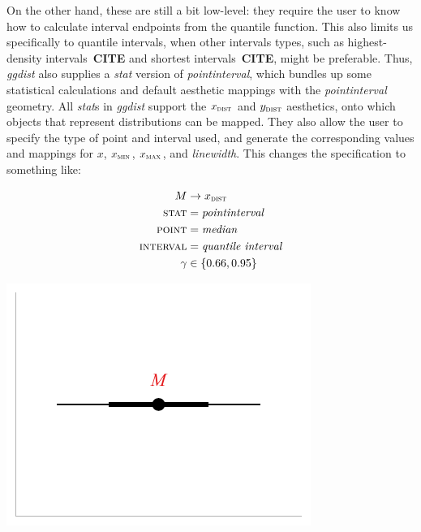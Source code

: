 \documentclass[journal]{vgtc}                     %
\begin{document}
On the other hand, these are still a bit low-level: they require the user to know how to calculate interval endpoints from the quantile function. This also limits us specifically to quantile intervals, when other intervals types, such as highest-density intervals~\textbf{CITE} and shortest intervals~\textbf{CITE}, might be preferable. Thus, \textit{ggdist} also supplies a \textit{stat} version of \textit{pointinterval}, which bundles up some statistical calculations and default aesthetic mappings with the \textit{pointinterval} geometry. All \textit{stat}s in \textit{ggdist} support the $x_\textsc{dist}$ and $y_\textsc{dist}$ aesthetics, onto which objects that represent distributions can be mapped. They also allow the user to specify the type of point and interval used, and generate the corresponding values and mappings for $x$, $x_\textsc{min}$, $x_\textsc{max}$, and \textit{linewidth}. This changes the specification to something like:


\noindent
\begin{minipage}{.5\columnwidth}

\begin{align*}
M &\rightarrow x_\textsc{dist}\\
\textsc{stat} &= \mathit{pointinterval}\\
\textsc{point} &= \mathit{median}\\
\textsc{interval} &= \textit{quantile interval}\\
\gamma &\in \{0.66, 0.95\}
\end{align*}
\end{minipage}%
  \begin{minipage}{.4\columnwidth}
    \centering
    \includegraphics[width=1.2\columnwidth]{figs/3-stat_pointinterval_A.pdf}
  \end{minipage}
\hfill\break
\end{document}
